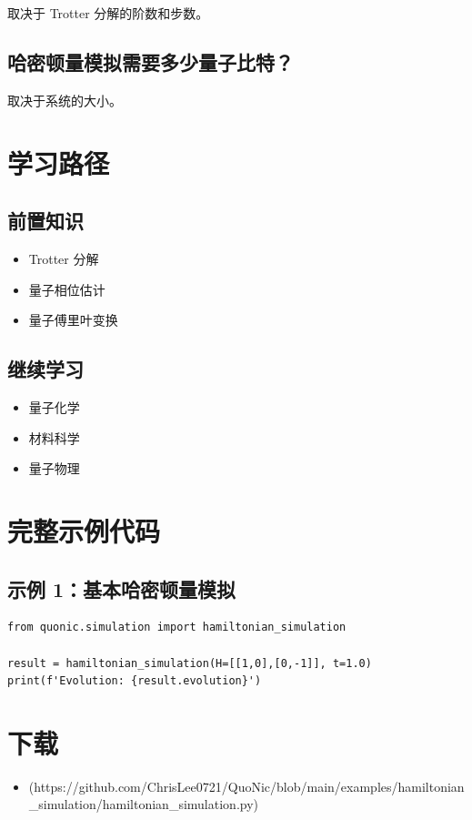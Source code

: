 \documentclass[12pt,a4paper]{article}
\begin{document}
取决于 Trotter 分解的阶数和步数。

\subsection{哈密顿量模拟需要多少量子比特？}

取决于系统的大小。

\section{学习路径}

\subsection{前置知识}
\begin{itemize}
  \item Trotter 分解
  \item 量子相位估计
  \item 量子傅里叶变换
\end{itemize}

\subsection{继续学习}
\begin{itemize}
  \item 量子化学
  \item 材料科学
  \item 量子物理
\end{itemize}

\section{完整示例代码}

\subsection{示例 1：基本哈密顿量模拟}

\begin{verbatim}
from quonic.simulation import hamiltonian_simulation

result = hamiltonian_simulation(H=[[1,0],[0,-1]], t=1.0)
print(f'Evolution: {result.evolution}')
\end{verbatim}

\section{下载}

\begin{itemize}
  \item [hamiltonian\_simulation.py](https://github.com/ChrisLee0721/QuoNic/blob/main/examples/hamiltonian_simulation/hamiltonian_simulation.py)
\end{itemize}
\end{document}
